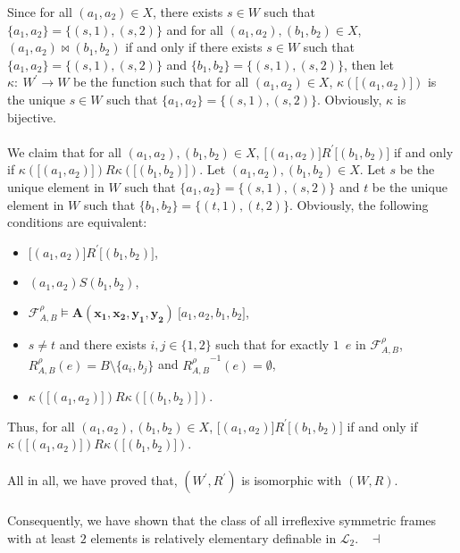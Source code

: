 \documentclass[draft]{article}
\newenvironment{proof}{{\bf Proof:}}{~$\dashv$\\}
\begin{document}
\begin{proof}
\begin{itemize}
%
%
\end{itemize}
%
%
Since for all $(a_{1},a_{2}){\in}X$, there exists $s{\in}W$ such that $\{a_{1},a_{2}\}{=}\{(s,1),(s,2)\}$ and for all $(a_{1},a_{2}),(b_{1},b_{2}){\in}X$, $(a_{1},a_{2}){\bowtie}(b_{1},b_{2})$ if and only if there exists $s{\in}W$ such that $\{a_{1},a_{2}\}{=}\{(s,1),(s,2)\}$ and $\{b_{1},b_{2}\}{=}\{(s,1),(s,2)\}$, then let $\kappa:\ W^{\prime}{\longrightarrow}W$ be the function such that for all $(a_{1},a_{2}){\in}X$, $\kappa(\lbrack(a_{1},a_{2})\rbrack)$ is the unique $s{\in}W$ such that $\{a_{1},a_{2}\}{=}\{(s,1),(s,2)\}$.
Obviously, $\kappa$ is bijective.
%
\\
\\
%
%
We claim that for all $(a_{1},a_{2}),(b_{1},b_{2}){\in}X$, $\lbrack(a_{1},a_{2})\rbrack{R^{\prime}}\lbrack(b_{1},b_{2})\rbrack$ if and only if $\kappa(\lbrack(a_{1},a_{2})\rbrack){R}\kappa(\lbrack(b_{1},b_{2})\rbrack)$.
Let $(a_{1},a_{2}),(b_{1},b_{2}){\in}X$.
Let $s$ be the unique element in $W$ such that $\{a_{1},a_{2}\}{=}\{(s,1),(s,2)\}$ and $t$ be the unique element in $W$ such that $\{b_{1},b_{2}\}{=}\{(t,1),(t,2)\}$.
Obviously, the following conditions are equivalent:
%
%
\begin{itemize}
%
%
\item $\lbrack(a_{1},a_{2})\rbrack{R^{\prime}}\lbrack(b_{1},b_{2})\rbrack$,
%
%
\item $(a_{1},a_{2}){S}(b_{1},b_{2})$,
%
%
\item ${\mathcal F}^{\rho}_{A,B}{\models}\mathbf{A}(\mathbf{x_{1}},\mathbf{x_{2}},\mathbf{y_{1}},\mathbf{y_{2}})\ \lbrack a_{1},a_{2},b_{1},b_{2}\rbrack$,
%
%
\item $s{\not=}t$ and there exists $i,j{\in}\{1,2\}$ such that for exactly $1$~$e$ in ${\mathcal F}_{A,B}^{\rho}$, $R_{A,B}^{\rho}(e){=}
%
%
%
%
%
%
%
%
%
%
%
%
$\linebreak$
%
%
%
%
%
%
%
%
%
%
%
%
B{\setminus}\{a_{i},b_{j}\}$ and ${R_{A,B}^{\rho}}^{{-}1}(e){=}\emptyset$,
%
%
\item $\kappa(\lbrack(a_{1},a_{2})\rbrack){R}\kappa(\lbrack(b_{1},b_{2})\rbrack)$.
%
%
\end{itemize}
%
%
Thus, for all $(a_{1},a_{2}),(b_{1},b_{2}){\in}X$, $\lbrack(a_{1},a_{2})\rbrack{R^{\prime}}\lbrack(b_{1},b_{2})\rbrack$ if and only if $\kappa(\lbrack(a_{1},a_{2})\rbrack){R}
%
%
%
%
%
%
%
%
%
%
%
%
$\linebreak$
%
%
%
%
%
%
%
%
%
%
%
%
\kappa(\lbrack(b_{1},b_{2})\rbrack)$.
%
%
\\
\\
%
%
All in all, we have proved that, $(W^{\prime},R^{\prime})$ is isomorphic with $(W,R)$.
%
%
\\
\\
%
%
Consequently, we have shown that the class of all irreflexive symmetric frames with at least $2$ elements is relatively elementary definable in ${\mathcal L}_{2}$.
%
%
\medskip
%
%
\end{proof}
\end{document}
